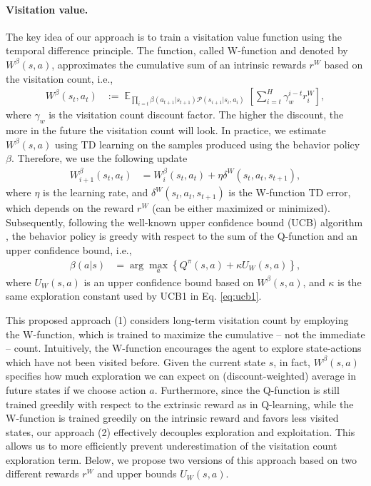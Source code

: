 \documentclass{article}
\DeclareMathOperator{\EV}{\mathbb{E}}
\newcommand{\EVV}[2]{\EV_{#1}\!\left[{#2}\right]}
\providecommand{\prob}{\mathcal{P}}
\newcommand{\coeff}{\kappa}
\begin{document}
\paragraph{Visitation value.}
The key idea of our approach is to train a visitation value function using the temporal difference principle. The function, called W-function and denoted by $W^\beta(s,a)$, approximates the cumulative sum of an intrinsic rewards $r^W$ based on the visitation count, i.e.,
\begin{align}
W^\beta(s_t, a_t) &:= \EVV{\prod_{i=t} \beta(a_{t+1}|s_{t+1}) \prob(s_{i+1}|s_i,a_i)}{ \sum_{i=t}^H \gamma_w^{i-t} r^W_{i}},
\end{align}
where $\gamma_w$ is the visitation count discount factor. The higher the discount, the more in the future the visitation count will look. 
In practice, we estimate $W^\beta(s,a)$ using TD learning on the samples
produced using the behavior policy $\beta$. 
Therefore, we use the following update 
\begin{align}
W_{i+1}^\beta(s_t,a_t) &= W_i^\beta(s_t,a_t) + \eta \delta^W(s_t,a_t,s_{t+1}),
\end{align}
where $\eta$ is the learning rate, and $\delta^W(s_t,a_t,s_{t+1})$ is the W-function TD error, which depends on the reward $r^W$ (can be either maximized or minimized).
Subsequently, following the well-known upper confidence bound (UCB) algorithm \citep{lai1985asymptotically}, the behavior policy is greedy with respect to the sum of the Q-function and an upper confidence bound, i.e.,
\begin{align}
	\beta(a|s) &= \arg\max_{a}\left\lbrace Q^\pi(s,a) + \coeff U_W(s,a)\right\rbrace, \label{eq:vv_beta_generic}
\end{align}
where $U_W(s,a)$ is an upper confidence bound based on $W^\beta(s,a)$, and $\coeff$ is the same exploration constant used by UCB1 in Eq. \eqref{eq:ucb1}.

This proposed approach (1) considers long-term visitation count by employing the W-function, which is trained to maximize the cumulative -- not the immediate -- count. Intuitively, the W-function encourages the agent to explore state-actions which have not been visited before. Given the current state $s$, in fact, $W^\beta(s,a)$ specifies how much exploration we can expect on (discount-weighted) average in future states if we choose action $a$. 
Furthermore, since the Q-function is still trained greedily with respect to the extrinsic reward as in Q-learning, while the W-function is trained greedily on the intrinsic reward and favors less visited states, our approach (2) effectively decouples exploration and exploitation. This allows us to more efficiently prevent underestimation of the visitation count exploration term.
Below, we propose two versions of this approach based on two different rewards $r^W$ and upper bounds $U_W(s,a)$.
\end{document}

